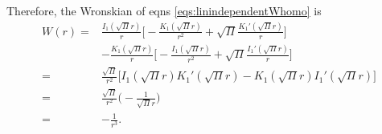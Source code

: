\documentclass[twocolumn,amsmath,amssymb,aps]{revtex4-1}%
\begin{document}
Therefore, the Wronskian of eqns \ref{eqs:linindependentWhomo} is
\begin{align}\label{eq:wronskian}
  W(r)=
  & \frac{I_1(\sqrt{\Pi}r)}{r}\bigg[-\frac{K_1(\sqrt{\Pi}r)}{r^2}
    +\sqrt{\Pi}\frac{K_1'(\sqrt{\Pi}r)}{r}\bigg]\nonumber\\
  &-\frac{K_1(\sqrt{\Pi}r)}{r}\bigg[-\frac{I_1(\sqrt{\Pi}r)}{r^2}
    +\sqrt{\Pi}\frac{I_1'(\sqrt{\Pi}r)}{r}\bigg]\nonumber\\
  =& \frac{\sqrt{\Pi}}{r^2}\bigg[I_1(\sqrt{\Pi}r)K_1'(\sqrt{\Pi}r)
     - K_1(\sqrt{\Pi}r)I_1'(\sqrt{\Pi}r)\bigg]\nonumber\\
  =& \frac{\sqrt{\Pi}}{r^2}\bigg(-\frac{1}{\sqrt{\Pi}r}\bigg)\nonumber\\
  =& -\frac{1}{r^3}.
\end{align}
\end{document}
